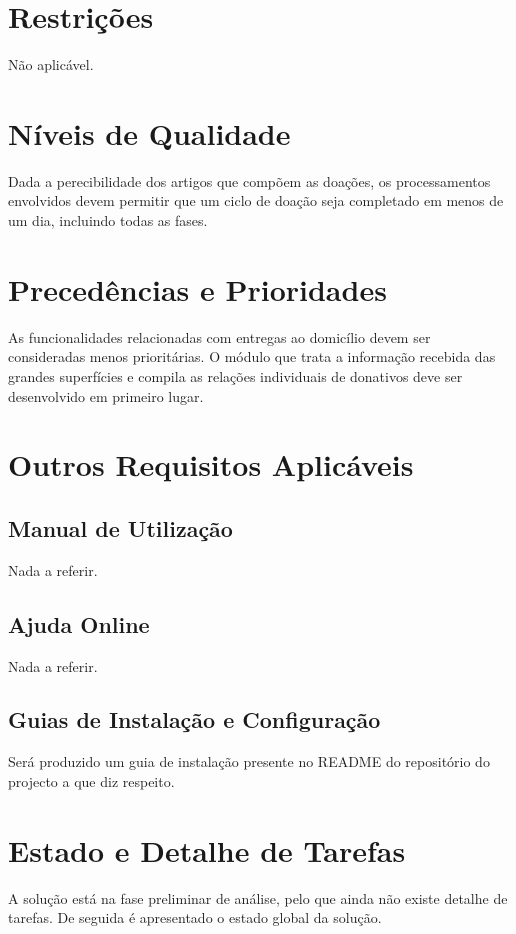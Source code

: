 \section{Restrições}

Não aplicável.

\section{Níveis de Qualidade}

Dada a perecibilidade dos artigos que compõem as doações, os processamentos envolvidos devem permitir que um ciclo de doação seja completado em menos de um dia, incluindo todas as fases.\\

\section{Precedências e Prioridades}
As funcionalidades relacionadas com entregas ao domicílio devem ser consideradas menos prioritárias. O módulo que trata a informação recebida das grandes superfícies e compila as relações individuais de donativos deve ser desenvolvido em primeiro lugar.\\

\section{Outros Requisitos Aplicáveis}
\subsection{Manual de Utilização}
Nada a referir.
\subsection{Ajuda Online}
Nada a referir.
\subsection{Guias de Instalação e Configuração}
Será produzido um guia de instalação presente no README do repositório do projecto a que diz respeito.

\section{Estado e Detalhe de Tarefas}
A solução está na fase preliminar de análise, pelo que ainda não existe detalhe de tarefas. De seguida é apresentado o estado global da solução.
